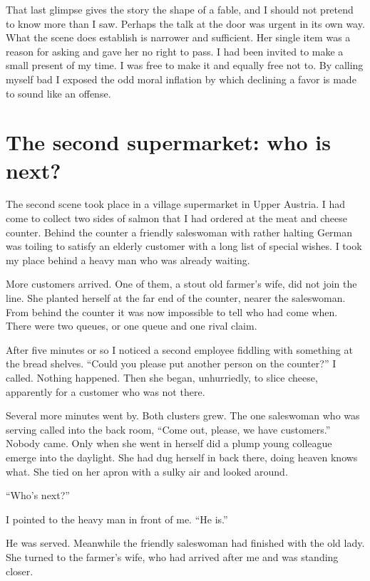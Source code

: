 \documentclass[12pt,a4paper]{book}
\begin{document}
That last glimpse gives the story the shape of a fable, and I should not pretend to know more than I saw. Perhaps the talk at the door was urgent in its own way. What the scene does establish is narrower and sufficient. Her single item was a reason for asking and gave her no right to pass. I had been invited to make a small present of my time. I was free to make it and equally free not to. By calling myself bad I exposed the odd moral inflation by which declining a favor is made to sound like an offense.

\section{The second supermarket: who is next?}

The second scene took place in a village supermarket in Upper Austria. I had come to collect two sides of salmon that I had ordered at the meat and cheese counter. Behind the counter a friendly saleswoman with rather halting German was toiling to satisfy an elderly customer with a long list of special wishes. I took my place behind a heavy man who was already waiting.

More customers arrived. One of them, a stout old farmer's wife, did not join the line. She planted herself at the far end of the counter, nearer the saleswoman. From behind the counter it was now impossible to tell who had come when. There were two queues, or one queue and one rival claim.

After five minutes or so I noticed a second employee fiddling with something at the bread shelves. ``Could you please put another person on the counter?'' I called. Nothing happened. Then she began, unhurriedly, to slice cheese, apparently for a customer who was not there.

Several more minutes went by. Both clusters grew. The one saleswoman who was serving called into the back room, ``Come out, please, we have customers.'' Nobody came. Only when she went in herself did a plump young colleague emerge into the daylight. She had dug herself in back there, doing heaven knows what. She tied on her apron with a sulky air and looked around.

``Who's next?''

I pointed to the heavy man in front of me. ``He is.''

He was served. Meanwhile the friendly saleswoman had finished with the old lady. She turned to the farmer's wife, who had arrived after me and was standing closer.
\end{document}

